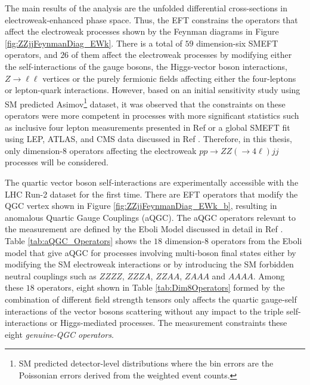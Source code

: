 The main results of the analysis are the unfolded differential cross-sections in electroweak-enhanced phase space. Thus, the EFT constrains the operators that affect the electroweak processes shown by the Feynman diagrams in Figure \ref{fig:ZZjjFeynmanDiag_EWk}. There is a total of $59$ dimension-six SMEFT operators, and $26$ of them affect the electroweak processes by modifying either the self-interactions of the gauge bosons, the Higgs-vector boson interactions, $Z \rightarrow \ell \ell$ vertices or the purely fermionic fields affecting either the four-leptons or lepton-quark interactions. However, based on an initial sensitivity study using SM predicted Asimov\footnote{SM predicted detector-level distributions where the bin errors are the Poissonian errors derived from the weighted event counts.} dataset, it was observed that the constraints on these operators were more competent in processes with more significant statistics such as inclusive four lepton measurements presented in Ref \cite{Inclusive_FourLepton} or a global SMEFT fit using LEP, ATLAS, and CMS data discussed in Ref \cite{GlobalEFT_Dim6}. Therefore, in this thesis, only dimension-8 operators affecting the electroweak $pp\rightarrow ZZ (\rightarrow 4 \ell) jj$ processes will be considered. 

The quartic vector boson self-interactions are experimentally accessible with the LHC Run-2 dataset for the first time. There are EFT operators that modify the QGC vertex shown in Figure \ref{fig:ZZjjFeynmanDiag_EWk_b}, resulting in anomalous Quartic Gauge Couplings (aQGC). The aQGC operators relevant to the measurement are defined by the Eboli Model discussed in detail in Ref \cite{EFT_Eboli}. Table \ref{tab:aQGC_Operators} shows the $18$ dimension-8 operators from the Eboli model that give aQGC for processes involving multi-boson final states either by modifying the SM electroweak interactions or by introducing the SM forbidden neutral couplings such as $ZZZZ$, $ZZZA$, $ZZAA$, $ZAAA$ and $AAAA$. Among these $18$ operators, eight shown in Table \ref{tab:Dim8Operators} formed by the combination of different field strength tensors only affects the quartic gauge-self interactions of the vector bosons scattering without any impact to the triple self-interactions or Higgs-mediated processes. The measurement constraints these eight \textit{genuine-QGC operators}. 

